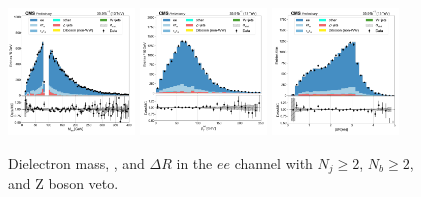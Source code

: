 \begin{figure}[htb!]
    \centering
    \includegraphics[width=0.3\textwidth]{chapters/Analysis/sectionPlots/figures/data_mc_overlays/ee_2016_cat_gt2_gt2_b_signal_linear_lepton_dilepton1_mass}
    \includegraphics[width=0.3\textwidth]{chapters/Analysis/sectionPlots/figures/data_mc_overlays/ee_2016_cat_gt2_gt2_b_signal_linear_lepton_dilepton1_pt}
    \includegraphics[width=0.3\textwidth]{chapters/Analysis/sectionPlots/figures/data_mc_overlays/ee_2016_cat_gt2_gt2_b_signal_linear_lepton_dilepton1_delta_r}
    \caption{Dielectron mass, \pt, and $\Delta R$ in the $ee$ channel
    with $N_{j} \geq 2$, $N_{b} \geq 2$, and Z boson veto.}
    \label{fig:analysis:plots:ee_2_dilepton}
\end{figure}

